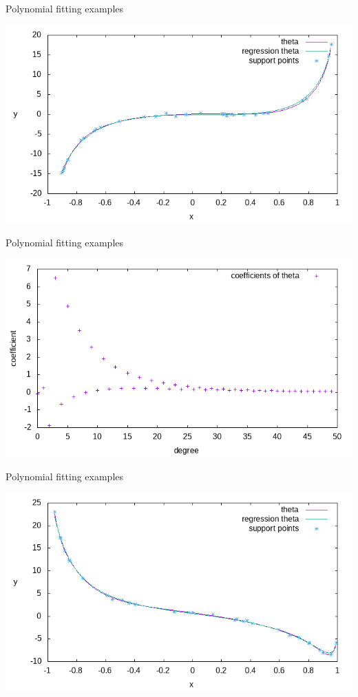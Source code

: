 \documentclass{beamer}
\begin{document}
\begin{frame}{Polynomial fitting examples}
\begin{center}
\includegraphics[width=\textwidth]{source/theta_plot_1.png}
\end{center}
\end{frame}

\begin{frame}{Polynomial fitting examples}
\begin{center}
\includegraphics[width=\textwidth]{source/theta_coefficients_1.png}
\end{center}
\end{frame}

\begin{frame}{Polynomial fitting examples}
\begin{center}
\includegraphics[width=\textwidth]{source/theta_plot_2.png}
\end{center}
\end{frame}
\end{document}
